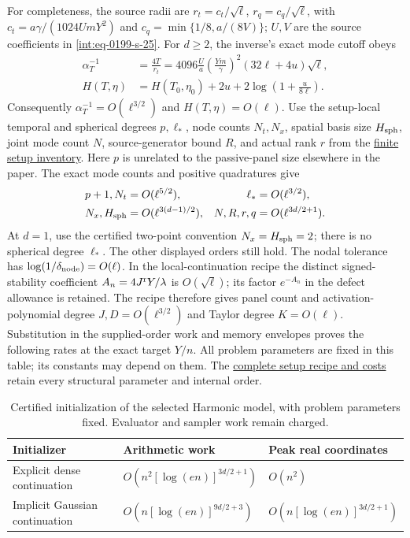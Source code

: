 For completeness, the source radii are
$r_t=c_t/\sqrt\ell$, $r_q=c_q/\sqrt\ell$, with
$c_t=a\gamma/(1024UmY^2)$ and $c_q=\min\{1/8,a/(8V)\}$;
$U,V$ are the source coefficients in \eqref{int:eq-0199-s-25}.
For $d\ge2$, the inverse's exact mode cutoff obeys
\begin{align*}
 \alpha_T^{-1}&=\frac{4T}{r_t}
 =4096\frac Ua\left(\frac{Ym}{\gamma}\right)^2
       (32\ell+4u)\sqrt\ell,\\
 H(T,\eta)&=H(T_0,\eta_0)+2u+
                2\log\left(1+\frac{u}{8\ell}\right).
\end{align*}
Consequently $\alpha_T^{-1}=O(\ell^{3/2})$ and $H(T,\eta)=O(\ell)$.
Use the setup-local temporal and spherical degrees $p,\ell_*$,
node counts $N_t,N_x$, spatial basis size $H_{\rm sph}$, joint mode
count $N$, source-generator bound $R$, and actual rank $r$ from the
\hyperref[int:harmonic-efficient-supplied-orders]{finite setup inventory}.
Here $p$ is unrelated to the passive-panel size elsewhere in the paper.
The exact mode counts and positive quadratures give
\begin{align*}
 p+1,N_t&=O(\ell^{5/2}),
 &\ell_*&=O(\ell^{3/2}),\\
 N_x,H_{\rm sph}&=O(\ell^{3(d-1)/2}),
 &N,R,r,q&=O(\ell^{3d/2+1}).
\end{align*}
At $d=1$, use the certified two-point convention $N_x=H_{\rm sph}=2$;
there is no spherical degree $\ell_*$. The other displayed orders still hold.
The nodal tolerance has $\log(1/\delta_{\rm node})=O(\ell)$.
In the local-continuation recipe the distinct signed-stability coefficient
$A_n=4J^{\rm r}Y/\lambda$ is $O(\sqrt\ell)$; its factor $e^{-A_n}$
in the defect allowance is retained. The recipe therefore gives panel
count and activation-polynomial degree $J,D=O(\ell^{3/2})$ and Taylor
degree $K=O(\ell)$. Substitution in the supplied-order work and memory
envelopes proves the following rates at the exact target $Y/n$.
All problem parameters are fixed in this table; its constants may
depend on them. The
\hyperref[int:harmonic-efficient-orders]{complete setup recipe and costs}
retain every structural parameter and internal order.
\begin{table}[htbp]
\centering
\renewcommand{\arraystretch}{1.25}
\begin{tabular}{@{}lll@{}}
\toprule
Initializer & Arithmetic work & Peak real coordinates\\
\midrule
Explicit dense continuation
& $O(n^2[\log(en)]^{3d/2+1})$ & $O(n^2)$\\
Implicit Gaussian continuation
& $O(n[\log(en)]^{9d/2+3})$ & $O(n[\log(en)]^{3d/2+1})$\\
\bottomrule
\end{tabular}
\caption{Certified initialization of the selected Harmonic model, with
problem parameters fixed. Evaluator and sampler work remain charged.}
\label{tab:initialization}
\end{table}
